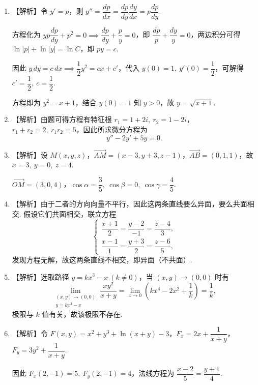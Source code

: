 \documentclass[a4paper,11pt]{ctexart}
\begin{document}
\begin{enumerate}[label=\arabic*., leftmargin=2em, itemsep=0.9em, topsep=0.6em]
  \item 【解析】令 $y' = p$，则 $y'' = \dfrac{dp}{dx} = \dfrac{dp}{dy}\dfrac{dy}{dx} = p\dfrac{dp}{dy}$.

  方程化为 $yp\dfrac{dp}{dy} + p^2 = 0 \implies \dfrac{dp}{dy} + \dfrac{p}{y} = 0$，即 $\dfrac{dp}{p} + \dfrac{dy}{y} = 0$，两边积分可得 $\ln|p| + \ln|y| = \ln C$，即 $py = c$.

  因此 $y\,dy = c\,dx \implies \dfrac{1}{2}y^2 = cx + c'$，代入 $y(0) = 1,\ y'(0) = \dfrac{1}{2}$，可解得 $c' = \dfrac{1}{2},\ c = \dfrac{1}{2}$.

  方程即为 $y^2 = x + 1$，结合 $y(0) = 1$ 知 $y > 0$，故 $y = \sqrt{x+1}$.

  \item 【解析】由题可得方程有特征根 $r_1 = 1 + 2i,\ r_2 = 1 - 2i$，$r_1 + r_2 = 2,\ r_1 r_2 = 5$，因此所求微分方程为
  \[
    y'' - 2y' + 5y = 0.
  \]

  \item 【解析】设 $M(x,y,z)$，$\overrightarrow{AM} = (x-3, y+3, z-1)$，$\overrightarrow{AB} = (0,1,1)$，故 $x=3,\ y=0,\ z=4$.

  $\overrightarrow{OM} = (3,0,4)$，$\cos\alpha = \dfrac{3}{5},\ \cos\beta = 0,\ \cos\gamma = \dfrac{4}{5}$.

  \item 【解析】由于二者的方向向量不平行，因此这两条直线要么异面，要么共面相交. 假设它们共面相交，联立方程
  \[
    \begin{cases}
      \dfrac{x+1}{2} = \dfrac{y-2}{-1} = \dfrac{z-4}{3}, \\[0.6em]
      \dfrac{x-1}{1} = \dfrac{y+3}{2} = \dfrac{z-6}{5},
    \end{cases}
  \]
  发现方程无解，故这两条直线不相交，即异面（不共面）.

  \item 【解析】选取路径 $y = kx^3 - x\ (k \neq 0)$，当 $(x,y)\to(0,0)$ 时有
  \[
    \lim_{\substack{(x,y)\to(0,0) \\ y=kx^3-x}} \frac{xy^2}{x+y} = \lim_{x\to 0}\left(kx^4 - 2x^2 + \frac{1}{k}\right) = \frac{1}{k},
  \]
  极限与 $k$ 值有关，故该极限不存在.

  \item 【解析】令 $F(x,y) = x^2 + y^3 + \ln(x+y) - 3$，$F_x = 2x + \dfrac{1}{x+y}$，$F_y = 3y^2 + \dfrac{1}{x+y}$.

  因此 $F_x(2,-1) = 5,\ F_y(2,-1) = 4$，法线方程为 $\dfrac{x-2}{5} = \dfrac{y+1}{4}$.


\end{enumerate}
\end{document}
